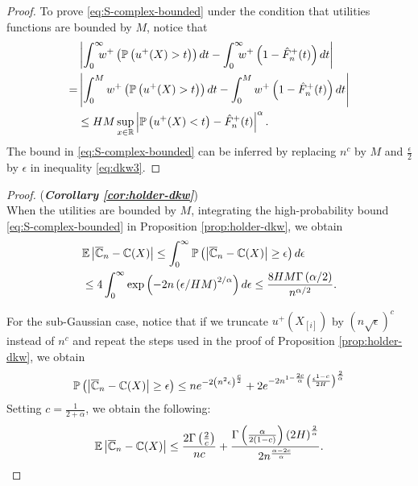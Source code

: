 \begin{proof}
To prove \eqref{eq:S-complex-bounded} under the condition that utilities functions are bounded by $M$, notice that
\begin{align*}
&\left|\int_0^{\infty}\!\!\!\! w^+\left(\Prob{u^+(X)>t}\right) dt- \int_0^{\infty} \!\!\!\! w^+\left(1- {\hat F^+_n}(t)\right) dt\right| \\ = &
    \left|\int_0^{M} w^+\left(\Prob{u^+(X)>t}\right) dt- \int_0^{M} w^+\left(1- {\hat F^+_n}(t)\right) dt\right| \\
    &\leq  HM \sup_{x\in\mathbb{R}}\left|\Prob{u^+(X)<t}-{\hat F^+_n}(t)\right|^\alpha.
\end{align*}
The  bound in \eqref{eq:S-complex-bounded} can be inferred by replacing $n^c$ by $M$ and $\frac{\epsilon}{2}$ by $\epsilon$ in inequality \eqref{eq:dkw3}.
\end{proof}

\begin{proof}(\textbf{\textit{Corollary \ref{cor:holder-dkw}}})\ \\
 When the utilities are bounded by $M$, integrating the high-probability bound \eqref{eq:S-complex-bounded} in Proposition \ref{prop:holder-dkw}, we obtain
 \begin{align}
& \mathbb{E} \left|\overline {\mathbb{C}}_n- \mathbb{C}(X) \right|  
  \le \int_0^{\infty} \mathbb{P}\left( \left|\overline {\mathbb{C}}_n- \mathbb{C}(X) \right| \geq  \epsilon \right) d\epsilon\nonumber\\
  &\le 4 \int_0^{\infty} \exp\left(-2n\left(\epsilon/HM\right)^{2/\alpha}\right) d\epsilon \le \frac{8HM \Gamma\left(\alpha/2\right)}{n^{\alpha/2}}.\label{eq:cor12-bd}
 \end{align}

For the sub-Gaussian case, notice that if we truncate $u^+\left(X_{[i]}\right)$  by $\left(n\sqrt{\epsilon}\right)^c$ instead of $n^c$ and repeat the steps used in the proof of Proposition
\ref{prop:holder-dkw}, we obtain
$$
\mathbb{P}\left( \left|\overline {\mathbb{C}}_n- \mathbb{C}(X) \right| \geq  \epsilon \right) \leq n e^{-2\left(n^2 \epsilon\right)^\frac{c}{2}} 
+ 2 e^{-2n^{1-\frac{2c}{\alpha}}\left(\frac{\epsilon^{1-c}}{2H}\right)^{\frac{2}{\alpha}}}
$$
Setting $c=\frac{1}{2+\alpha}$,
we obtain the following:
$$\mathbb{E} \left|\overline {\mathbb{C}}_n- \mathbb{C}(X) \right| \le \frac{2\Gamma\left(\frac{2}{c}\right)}{nc} + \frac{\Gamma\left(\frac{\alpha}{2\left(1-c\right)}\right)\left(2H\right)^{\frac{2}{\alpha}}}{2n^{\frac{\alpha-2c}{\alpha}}}.$$
\end{proof}

